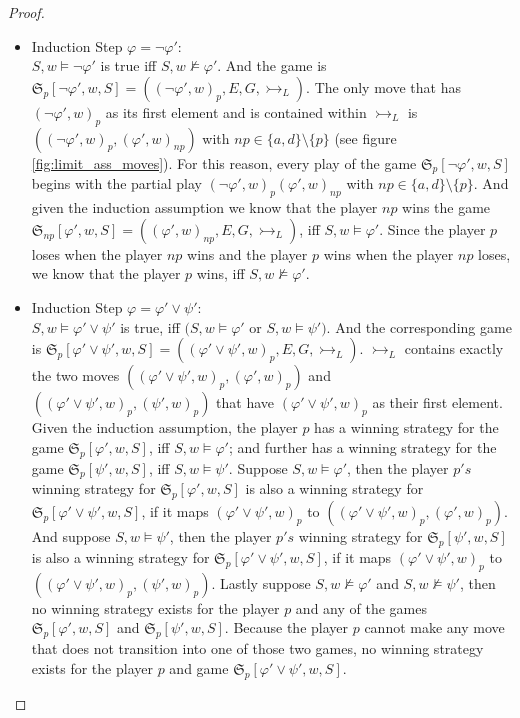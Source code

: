 \documentclass[a4paper,american]{paper}
\theoremstyle{definition}\newtheorem{definition}{Definition}
\begin{document}
\begin{proof}
\begin{itemize}
\item Induction Step $\varphi=\neg\varphi'$:\\
$S,w\vDash\neg\varphi'$ is true iff $S,w\nvDash\varphi'$. And the game is $\mathfrak{S}_p[\neg\varphi',w,S]=((\neg\varphi' ,w)_p, E, G, \rightarrowtail_L)$. The only move that has $(\neg\varphi' ,w)_p$ as its first element and is contained within $\rightarrowtail_L$ is $((\neg\varphi' ,w)_p, (\varphi' ,w)_{np})$ with $np\in\{a,d\}\setminus{}\{p\}$ (see figure \ref{fig:limit_ass_moves}). For this reason, every play of the game $\mathfrak{S}_p[\neg\varphi',w,S]$ begins with the partial play $(\neg\varphi' ,w)_p(\varphi' ,w)_{np}$ with $np\in\{a,d\}\setminus{}\{p\}$. And given the induction assumption we know that the player $np$ wins the game $\mathfrak{S}_{np}[\varphi',w,S]=((\varphi' ,w)_{np}, E, G, \rightarrowtail_L)$, iff $S,w\vDash\varphi'$. Since the player $p$ loses when the player $np$ wins and the player $p$ wins when the player $np$ loses, we know that the player $p$ wins, iff $S,w\nvDash\varphi'$.

\item Induction Step $\varphi=\varphi'\vee\psi'$:\\
$S,w\vDash\varphi'\vee\psi'$ is true, iff $(S,w\vDash\varphi'$ or $S,w\vDash\psi')$. And the corresponding game is $\mathfrak{S}_p[\varphi'\vee\psi',w,S]=((\varphi'\vee\psi' ,w)_p, E, G, \rightarrowtail_L)$. $\rightarrowtail_L$ contains exactly the two moves $((\varphi'\vee\psi' ,w)_p,(\varphi' ,w)_p)$ and $((\varphi'\vee\psi' ,w)_p,(\psi' ,w)_p)$ that have $(\varphi'\vee\psi' ,w)_p$ as their first element. Given the induction assumption, the player $p$ has a winning strategy for the game $\mathfrak{S}_{p}[\varphi' ,w,S]$, iff $S,w\vDash\varphi'$; and further has a winning strategy for the game $\mathfrak{S}_{p}[\psi' ,w,S]$, iff $S,w\vDash\psi'$. Suppose $S,w\vDash\varphi'$, then the player $p's$ winning strategy for $\mathfrak{S}_{p}[\varphi' ,w,S]$ is also a winning strategy for $\mathfrak{S}_p[\varphi'\vee\psi',w,S]$, if it maps $(\varphi'\vee\psi' ,w)_p$ to $((\varphi'\vee\psi' ,w)_p,(\varphi' ,w)_p)$. And suppose $S,w\vDash\psi'$, then the player $p's$ winning strategy for $\mathfrak{S}_{p}[\psi' ,w,S]$ is also a winning strategy for $\mathfrak{S}_p[\varphi'\vee\psi',w,S]$, if it maps $(\varphi'\vee\psi' ,w)_p$ to $((\varphi'\vee\psi' ,w)_p,(\psi' ,w)_p)$. Lastly suppose $S,w\nvDash\varphi'$ and $S,w\nvDash\psi'$, then no winning strategy exists for the player $p$ and any of the games $\mathfrak{S}_{p}[\varphi' ,w,S]$ and $\mathfrak{S}_{p}[\psi' ,w,S]$. Because the player $p$ cannot make any move that does not transition into one of those two games, no winning strategy exists for the player $p$ and game $\mathfrak{S}_p[\varphi'\vee\psi',w,S]$.


\end{itemize}
\end{proof}
\end{document}
